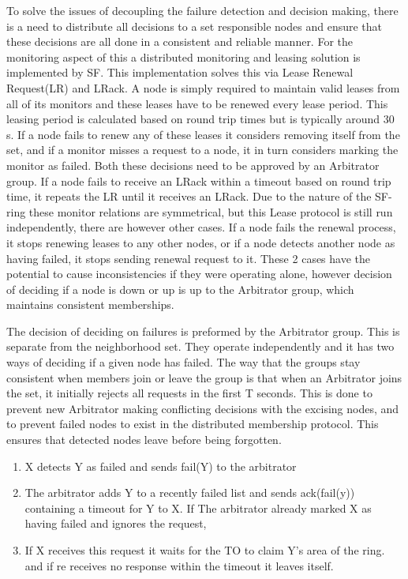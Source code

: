 \documentclass[a4paper,10pt,titlepage]{report}
\begin{document}
    To solve the issues of decoupling the failure detection and decision making, there is a need to distribute all decisions to a set responsible nodes and ensure that these decisions are all done in a consistent and reliable manner. For the monitoring aspect of this a distributed monitoring and leasing solution is implemented by SF. This implementation solves this via Lease Renewal Request(LR) and LRack. A node is simply required to maintain valid leases from all of its monitors and these leases have to be renewed every lease period. This leasing period is calculated based on round trip times but is typically around 30 s. If a node fails to renew any of these leases it considers removing itself from the set, and if a monitor misses a request to a node, it in turn considers marking the monitor as failed. Both these decisions need to be approved by an Arbitrator group. If a node fails to receive an LRack within a timeout based on round trip time, it repeats the LR until it receives an LRack. Due to the nature of the SF-ring these monitor relations are symmetrical, but this Lease protocol is still run independently, there are however other cases. If a node fails the renewal process, it stops renewing leases to any other nodes, or if a node detects another node as having failed, it stops sending renewal request to it. These 2 cases have the potential to cause inconsistencies if they were operating alone, however decision of deciding if a node is down or up is up to the Arbitrator group, which maintains consistent memberships. \\
    \vspace{5mm}

    The decision of deciding on failures is preformed by the Arbitrator group. This is separate from the neighborhood set. They operate independently and it has two ways of deciding if a given node has failed. The way that the groups stay consistent when members join or leave the group is that when an Arbitrator joins the set, it initially rejects all requests in the first T seconds. This is done to prevent new Arbitrator making conflicting decisions with the excising nodes, and to prevent failed nodes to exist in the distributed membership protocol. This ensures that detected nodes leave before being forgotten.\\
    \vspace{5mm}

    \begin{enumerate}
        \item X detects Y as failed and sends fail(Y) to the arbitrator
        \item The arbitrator adds Y to a recently failed list and sends ack(fail(y)) containing a timeout for Y to X. If The arbitrator already marked X as having failed and ignores the request,
        \item If X receives this request it waits for the TO to claim Y's area of the ring. and if re receives no response within the timeout it leaves itself.
    \end{enumerate}
\end{document}
